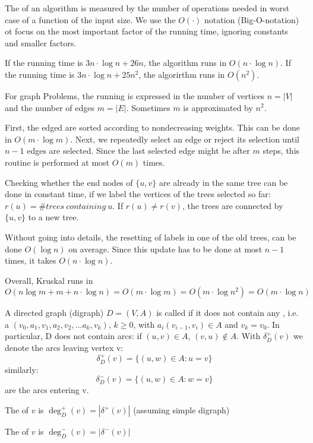\begin{lec}[2011-10-17]\end{lec}

\begin{defn+}
The  of an algorithm is measured by the number of operations needed in worst case of a function of the input size. We use the $O(\cdot)$ notation (Big-O-notation) ot focus on the most important factor of the running time, ignoring constants and smaller factors.
\end{defn+}

\begin{xmp+}
	If the running time is $3n \cdot \log n + 26n$, the algorithm runs in $O(n \cdot \log n)$. If the running time is $3n \cdot \log n + 25 n^2$, the algorirthm runs in $O(n^2)$.
\end{xmp+}

For graph Problems, the running is expressed in the number of vertices $n=|V|$ and the number of edges $m=|E|$. Sometimes $m$ is approximated by $n^2$.

\begin{xmp+}
	First, the edged are sorted according to nondecreasing weights. This can be done in $O(m\cdot \log m)$. Next, we repeatedly select an edge or reject its selection until $n-1$ edges are selected. Since the last selected edge might be after $m$ steps, this routine is performed at most $O(m)$ times.
	
	Checking whether the end nodes of $\{u,v\}$ are already in the same tree can be done in constant time, if we label the vertices of the trees selected so far: $r(u) = \# trees\: containing\: u$. If $r(u) \neq r(v)$, the trees are connected by $\{u,v\}$ to a new tree. 
	
	Without going into details, the resetting of labels in one of the old trees, can be done $O(\log n)$ on average. Since this update has to be done at most $n-1$ times, it takes $O(n\cdot \log n)$. 
	
	Overall, Kruskal runs in \[ O(n \log m + m + n \cdot \log n) = O(m \cdot \log m) = O(m \cdot \log n^2) = O(m \cdot \log n) \]
\end{xmp+}

\begin{defn+}
A directed graph (digraph) $D=(V,A)$  is called  if it does not contain any , i.e. a  $(v_0,a_1,v_1,a_2,v_2, ... a_k,v_k)$, $k \geq 0$, with $a_i(v_{i-1},v_i) \in A$ and $v_k = v_0$. In particular, D does not contain  arcs: if $(u,v)\in A$, $(v,u)\not \in A$. With $\delta_D^+(v)$ we denote the arcs leaving vertex v: 
\[ \delta_D^+(v) = \{(u,w) \in A: u = v\}\]
similarly:
\[\delta_D^-(v) = \{(u,w) \in A: w = v\}\]
are the arcs entering v.

The  of $v$ is $\deg^+_D(v) = | \delta^+(v) |$ (assuming simple digraph)

The  of $v$ is $\deg^-_D(v) = | \delta^-(v)|$
\end{defn+}

